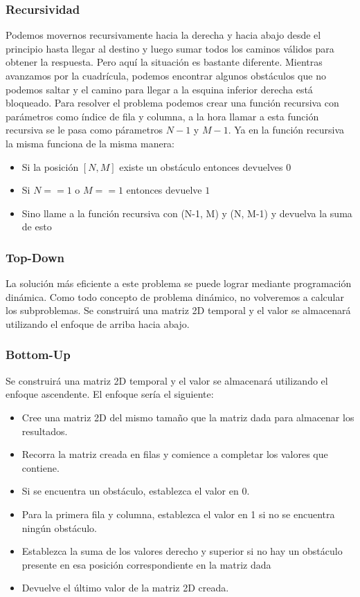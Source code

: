 \subsubsection{Recursividad}
Podemos movernos recursivamente hacia la derecha y hacia abajo desde el principio hasta llegar al destino y luego sumar todos los caminos válidos para obtener la respuesta. Pero aquí la situación es bastante diferente. Mientras avanzamos por la cuadrícula, podemos encontrar algunos obstáculos que no podemos saltar y el camino para llegar a la esquina inferior derecha está bloqueado. Para resolver el problema podemos crear una función recursiva con parámetros como índice de fila y columna, a la hora llamar a esta función recursiva se le pasa como párametros $N-1$ y $M-1$. Ya en la función recursiva la misma funciona de la misma manera:

\begin{itemize}
	\item Si la posición $[N,M]$ existe un obstáculo entonces devuelves $0$
	\item Si $N == 1$ o $M == 1$ entonces devuelve $1$
	\item Sino llame a la función recursiva con (N-1, M) y (N, M-1) y devuelva la suma de esto
\end{itemize}

\subsubsection{Top-Down}
La solución más eficiente a este problema se puede lograr mediante programación dinámica. Como todo concepto de problema dinámico, no volveremos a calcular los subproblemas. Se construirá una matriz 2D temporal y el valor se almacenará utilizando el enfoque de arriba hacia abajo.

\subsubsection{Bottom-Up}
Se construirá una matriz 2D temporal y el valor se almacenará utilizando el enfoque ascendente. El enfoque sería el siguiente:

\begin{itemize}
	\item Cree una matriz 2D del mismo tamaño que la matriz dada para almacenar los resultados.
	\item Recorra la matriz creada en filas y comience a completar los valores que contiene.
	\item Si se encuentra un obstáculo, establezca el valor en 0.
	\item Para la primera fila y columna, establezca el valor en 1 si no se encuentra ningún obstáculo.
	\item Establezca la suma de los valores derecho y superior si no hay un obstáculo presente en esa posición correspondiente en la matriz dada
	\item Devuelve el último valor de la matriz 2D creada.
\end{itemize}



